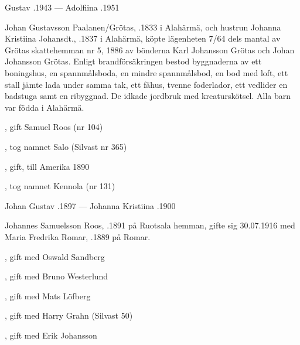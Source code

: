 Gustav .1943  ---  Adolfiina .1951


Johan Gustavsson Paalanen/Grötas, .1833 i Alahärmä, och hustrun Johanna Kristiina Johansdt., .1837 i Alahärmä, köpte lägenheten 7/64 dels mantal av Grötas skattehemman  nr 5, 1886 av bönderna Karl Johansson Grötas och Johan Johansson Grötas. Enligt brandförsäkringen bestod byggnaderna av ett boningshus, en spannmålsboda, en mindre spannmålsbod, en bod med loft, ett stall jämte lada under samma tak, ett fähus, tvenne foderlador, ett vedlider en badstuga samt en ribyggnad. De idkade jordbruk med kreaturskötsel. Alla barn var födda i Alahärmä.
\begin{jhchildren}
  \item {}
  \item {}, gift Samuel Roos (nr 104)
  \item {}, tog namnet Salo (Silvast nr 365)
  \item {}, gift, till Amerika 1890
  \item {}
  \item {}, tog namnet Kennola (nr 131)
\end{jhchildren}
Johan Gustav .1897  ---  Johanna Kristiina .1900






Johannes Samuelsson Roos, .1891 på Ruotsala hemman, gifte sig 30.07.1916 med Maria Fredrika Romar, .1889 på Romar.
\begin{jhchildren}
  \item {}, gift med Oswald Sandberg
  \item {}, gift med Bruno Westerlund
  \item {}, gift med Mats Löfberg
  \item {}, gift med Harry Grahn (Silvast 50)
  \item {}, gift med Erik Johansson
\end{jhchildren}

